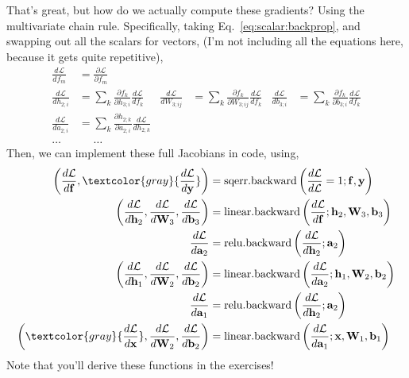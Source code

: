 \documentclass{article}
\newcommand{\dd}[2][]{\frac{\partial #1}{\partial #2}}
\newcommand{\dt}[2][]{\frac{d #1}{d #2}}
\newcommand{\dL}{\dt[\L]}
\newcommand{\bracket}[3]{\left#1 #3 \right#2}
\renewcommand{\b}{\bracket{(}{)}}
\newcommand{\x}{\mathbf{x}}
\newcommand{\y}{\mathbf{y}}
\newcommand{\f}{\mathbf{f}}
\newcommand{\h}{\mathbf{h}}
\newcommand{\bv}{\mathbf{b}}
\renewcommand{\a}{\mathbf{a}}
\newcommand{\W}{\mathbf{W}}
\renewcommand{\L}{\mathcal{L}}
\newcommand{\linearback}{\operatorname{linear{.}backward}}
\newcommand{\reluback}{\operatorname{relu{.}backward}}
\newcommand{\sqerrback}{\operatorname{sqerr{.}backward}}
\begin{document}
That's great, but how do we actually compute these gradients?
Using the multivariate chain rule.
Specifically, taking Eq.~\eqref{eq:scalar:backprop}, and swapping out all the scalars for vectors, 
%
(I'm not including all the equations here, because it gets quite repetitive),
\begin{subequations}
\label{eq:back_chain}
\begin{align}
  \dL{f_m} &= \dd[\L]{f_m}\\
  \nonumber
  \dL{h_{2;i}} &= \sum_k \dd[f_k]{h_{3; i}} \dL{f_k}&
  \dL{W_{3;ij}} &= \sum_k \dd[f_k]{W_{3; ij}} \dL{f_k}&
  \dL{b_{3;i}} &= \sum_k \dd[f_k]{b_{3; i}} \dL{f_k}\\
  \dL{a_{2;i}} &= \sum_k \dd[h_{2;k}]{a_{2;i}} \dL{h_{2; k}}\\
  \dots &\phantom{=} \dots
\end{align}
\end{subequations}
Then, we can implement these full Jacobians in code, using,
\begin{subequations}
\begin{align}
  \b{\dL{\f}, \textcolor{gray}{\dL{\y}}} &= \sqerrback\b{\dL{\L}=1; \f, \y}\\
  \b{\dL{\h_2}, \dL{\W_3}, \dL{\bv_3}} &= \linearback\b{\dL{\f}; \h_2, \W_3, \bv_3}\\
  \dL{\a_2} &= \reluback\b{\dL{\h_2}; \a_2}\\
  \b{\dL{\h_1}, \dL{\W_2}, \dL{\bv_2}} &= \linearback\b{\dL{\a_2}; \h_1, \W_2, \bv_2}\\
  \dL{\a_1} &= \reluback\b{\dL{\h_2}; \a_2}\\
  \b{\textcolor{gray}{\dL{\x}}, \dL{\W_2}, \dL{\bv_2}} &= \linearback\b{\dL{\a_1}; \x, \W_1, \bv_1}
\end{align}
\end{subequations}
Note that you'll derive these functions in the exercises!
\end{document}
